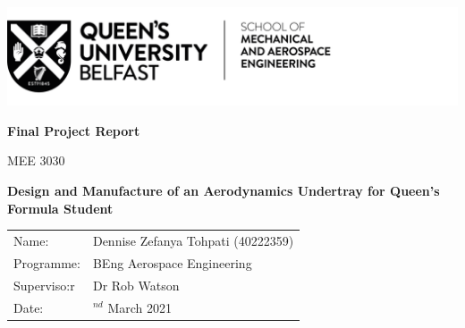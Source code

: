 \begin{titlepage}
\includegraphics[scale=1]{Figures/QUB LOGO - SMAE.png}
\centering

\vspace{4cm}
\textbf{Final Project Report}

MEE 3030

\vspace{2cm}
\textbf{\large{Design and Manufacture of an Aerodynamics Undertray for Queen's Formula Student}}


\vspace{8cm}
\begin{tabularx}{1\textwidth}{ 
   >{\raggedleft\arraybackslash}X 
   >{\raggedright\arraybackslash}X 
  }
  
Name: & \quad Dennise Zefanya Tohpati (40222359)\\
Programme: & \quad BEng Aerospace Engineering\\
Superviso:r & \quad Dr Rob Watson\\
Date: & \quad 22$^{nd}$ March 2021\\

\end{tabularx}
\end{titlepage}

